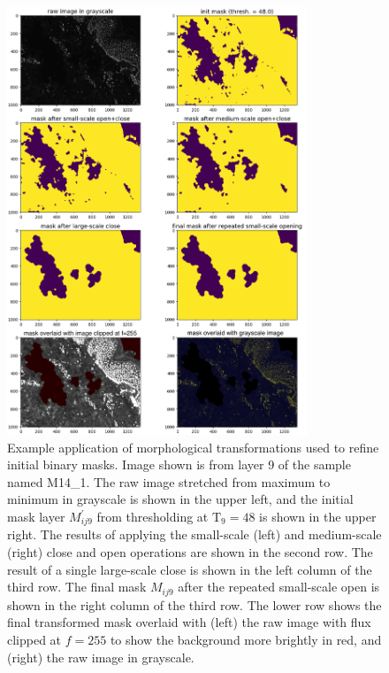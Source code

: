 \documentclass[letterpaper,11pt]{article}
\newcommand{\Tau}{\mathrm{T}}
\begin{document}
\begin{figure}[!ht]
\centering
\includegraphics[width=0.80\textwidth]{images/masking/image_286_layer_9_masks}
\caption{\footnotesize Example application of morphological transformations used to refine initial binary masks. Image shown is from layer 9 of the sample named M14\_1. The raw image stretched from maximum to minimum in grayscale is shown in the upper left, and the initial mask layer $M^{\prime}_{ij9}$ from thresholding at $\Tau_{9}=48$ is shown in the upper right. The results of applying the small-scale (left) and medium-scale (right) close and open operations are shown in the second row. The result of a single large-scale close is shown in the left column of the third row. The final mask $M_{ij9}$ after the repeated small-scale open is shown in the right column of the third row. The lower row shows the final transformed mask overlaid with (left) the raw image with flux clipped at $f=255$ to show the background more brightly in red, and (right) the raw image in grayscale.}
\label{fig:morphological_transformations}
\end{figure}
\end{document}
